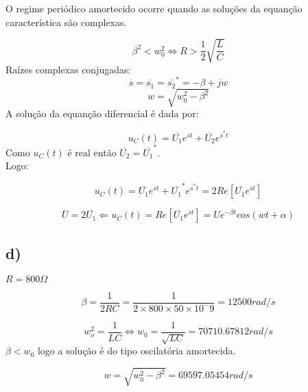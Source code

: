 O regime periódico amortecido ocorre quando as soluções da equanção característica são complexas.

\begin{equation}
  \beta^2 < w_0^2 \Leftrightarrow R> \frac{1}{2} \sqrt{\frac{L}{C}}
\end{equation}
Raízes complexas conjugadas: 
\begin{equation}
  \overline{s} = \overline{s_1} = \overline{s_2}^* = -\beta+jw
\end{equation}
\begin{equation}
  w = \sqrt{w_0^2 - \beta^2}
\end{equation}
A solução da equanção diferencial é dada por:

\begin{equation}
  u_C(t) = \overline{U_1} e^{\overline{s}t} + \overline{U_2} e^{\overline{s}^* t}
\end{equation}
Como $u_C(t)$ é real então $\overline{U_2} = \overline{U_1}^*$.
\\Logo:

\begin{equation}
  u_C(t) = \overline{U_1} e^{\overline{s}t} + \overline{U_1}^* e^{\overline{s}^* t} = 2Re [ \overline{U_1} e^{\overline{s}t}]
\end{equation}

\begin{equation}
  \overline{U} = 2\overline{U_1} \Leftarrow u_C(t) = Re [\overline{U_1} e^{\overline{s}t}] = U e^{-\beta t} cos(wt + \alpha)
\end{equation}
\clearpage

\subsection*{d)}

$R = 800 \Omega$

\begin{equation}
  \beta = \frac{1}{2RC} = \frac{1}{2\times800\times50\times10^-9} = 12500 rad/s
\end{equation}

\begin{equation}
    w_o^2 = \frac{1}{LC} \Leftrightarrow w_0 = \frac{1}{\sqrt{LC}} = 70710.67812 rad/s
\end{equation}
$\beta < w_0$ logo a solução é do tipo oscilatória amortecida.

\begin{equation}
  w = \sqrt{w_0^2 - \beta^2} = 69597.05454 rad/s
\end{equation}

